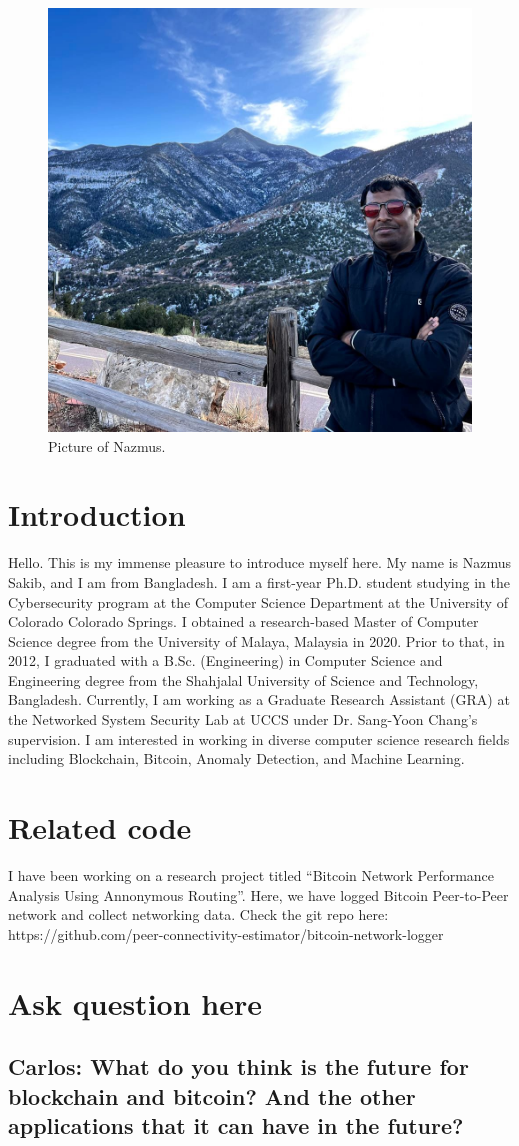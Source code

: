 

\begin{figure}[h!]
\centering
\includegraphics[width=.5\columnwidth]{picture-nazmus.jpg}
\caption{Picture of Nazmus.}
\label{fig:my-picture}
\end{figure}

\section{Introduction}

Hello. This is my immense pleasure to introduce myself here. My name is Nazmus Sakib, and I am from Bangladesh. I am a first-year Ph.D. student studying in the Cybersecurity program at the Computer Science Department at the University of Colorado Colorado Springs. I obtained a research-based Master of Computer Science degree from the University of Malaya, Malaysia in 2020. Prior to that, in 2012, I graduated with a B.Sc. (Engineering) in Computer Science and Engineering degree from the Shahjalal University of Science and Technology, Bangladesh. Currently, I am working as a Graduate Research Assistant (GRA) at the Networked System Security Lab at UCCS under Dr. Sang-Yoon Chang's supervision. I am interested in working in diverse computer science research fields including Blockchain, Bitcoin, Anomaly Detection, and Machine Learning.

\section{Related code}

I have been working on a research project titled ``Bitcoin Network Performance Analysis Using Annonymous Routing''. Here, we have logged Bitcoin Peer-to-Peer network and collect networking data.
Check the git repo here: https://github.com/peer-connectivity-estimator/bitcoin-network-logger

\section{Ask question here}

\subsection{Carlos: What do you think is the future for blockchain and bitcoin? And the other applications that it can have in the future?}